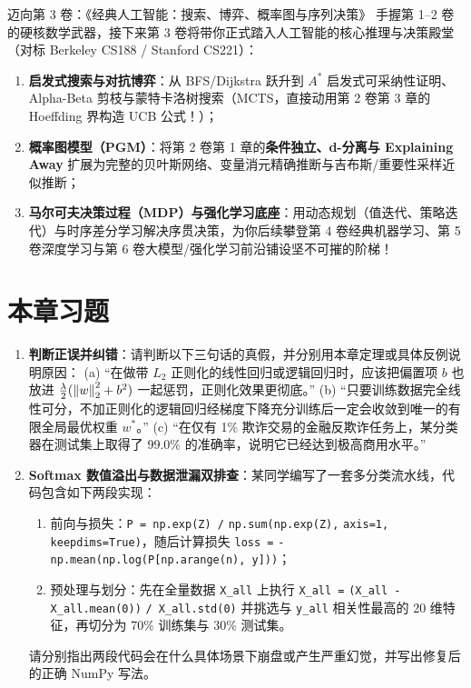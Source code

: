 \begin{insightBox}{迈向第 3 卷：《经典人工智能：搜索、博弈、概率图与序列决策》}
手握第 1--2 卷的硬核数学武器，接下来第 3 卷将带你正式踏入人工智能的核心推理与决策殿堂（对标 Berkeley CS188 / Stanford CS221）：
\begin{enumerate}
  \item \textbf{启发式搜索与对抗博弈}：从 BFS/Dijkstra 跃升到 $A^*$ 启发式可采纳性证明、Alpha-Beta 剪枝与蒙特卡洛树搜索（MCTS，直接动用第 2 卷第 3 章的 Hoeffding 界构造 UCB 公式！）；
  \item \textbf{概率图模型（PGM）}：将第 2 卷第 1 章的\textbf{条件独立、d-分离与 Explaining Away} 扩展为完整的贝叶斯网络、变量消元精确推断与吉布斯/重要性采样近似推断；
  \item \textbf{马尔可夫决策过程（MDP）与强化学习底座}：用动态规划（值迭代、策略迭代）与时序差分学习解决序贯决策，为你后续攀登第 4 卷经典机器学习、第 5 卷深度学习与第 6 卷大模型/强化学习前沿铺设坚不可摧的阶梯！
\end{enumerate}
\end{insightBox}

\section{本章习题}
\label{sec:ch6-exercises}

\begin{enumerate}[label=\textbf{6.\arabic*}]
  \item \textbf{判断正误并纠错}：请判断以下三句话的真假，并分别用本章定理或具体反例说明原因：
  (a) “在做带 $L_2$ 正则化的线性回归或逻辑回归时，应该把偏置项 $b$ 也放进 $\frac{\lambda}{2}(\left\|w\right\|_2^2 + b^2)$ 一起惩罚，正则化效果更彻底。”
  (b) “只要训练数据完全线性可分，不加正则化的逻辑回归经梯度下降充分训练后一定会收敛到唯一的有限全局最优权重 $w^*$。”
  (c) “在仅有 1\% 欺诈交易的金融反欺诈任务上，某分类器在测试集上取得了 99.0\% 的准确率，说明它已经达到极高商用水平。”

  \item \textbf{Softmax 数值溢出与数据泄漏双排查}：某同学编写了一套多分类流水线，代码包含如下两段实现：
  \begin{enumerate}[label=(\roman*)]
    \item 前向与损失：\texttt{P = np.exp(Z) /} \texttt{np.sum(np.exp(Z),} \texttt{axis=1,} \texttt{keepdims=True)}，随后计算损失 \texttt{loss =} \texttt{-np.mean(}\allowbreak\texttt{np.log(}\allowbreak\texttt{P[np.arange(n), y]))}；
    \item 预处理与划分：先在全量数据 \texttt{X\_all} 上执行 \texttt{X\_all =} \texttt{(X\_all - X\_all.mean(0))} \texttt{/ X\_all.std(0)} 并挑选与 \texttt{y\_all} 相关性最高的 20 维特征，再切分为 70\% 训练集与 30\% 测试集。
  \end{enumerate}
  请分别指出两段代码会在什么具体场景下崩盘或产生严重幻觉，并写出修复后的正确 NumPy 写法。
\end{enumerate}

